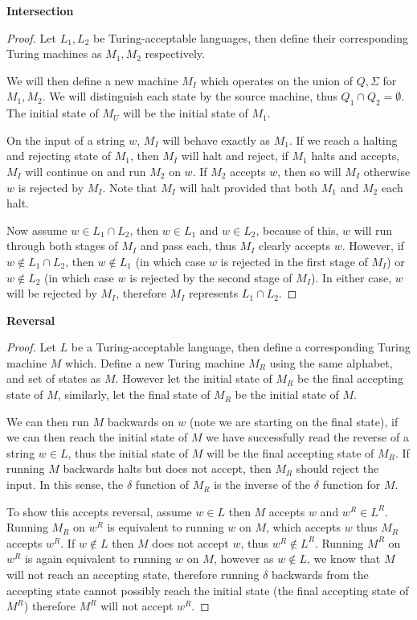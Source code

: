 \documentclass[12pt]{jhwhw}
\begin{document}
	\bigbreak
	\textbf{Intersection} \\
	\begin{proof}
		Let $L_1, L_2$ be Turing-acceptable languages, then define their corresponding 
		Turing machines as $M_1, M_2$ respectively.

		We will then define a new machine $M_I$ which operates on the union of
		$Q,\Sigma$ for $M_1, M_2$. We will distinguish each state by the source machine,
		thus $Q_1 \cap Q_2 = \emptyset$. The initial state of $M_U$ will be the initial
		state of $M_1$.

		On the input of a string $w$, $M_I$ will behave exactly as $M_1$. If we reach
		a halting and rejecting state of $M_1$, then $M_I$ will halt and reject, if $M_1$
		halts and accepts, $M_I$ will continue on and run $M_2$ on $w$. If $M_2$ accepts
		$w$, then so will $M_I$ otherwise $w$ is rejected by $M_I$.
		Note that $M_I$ will halt provided that both $M_1$ and $M_2$ each halt.

		Now assume $w\in L_1\cap L_2$, then $w\in L_1$ and $w\in L_2$, because of this,
		$w$ will run through both stages of $M_I$ and pass each, thus $M_I$ clearly accepts $w$.
		However, if $w\not\in L_1\cap L_2$, then $w\not\in L_1$ (in which case
		$w$ is rejected in the first stage of $M_I$) or $w\not\in L_2$ (in which case
		$w$ is rejected by the second stage of $M_I$). In either case, $w$ will be rejected
		by $M_I$, therefore $M_I$ represents $L_1\cap L_2$.
	\end{proof}

	\bigbreak
	\textbf{Reversal} \\
	\begin{proof}
		Let $L$ be a Turing-acceptable language, then define a corresponding Turing machine $M$
		which. Define a new Turing machine $M_R$ using the same alphabet, and set of states as $M$.
		However let the initial state of $M_R$ be the final accepting state of $M$, similarly, let
		the final state of $M_R$ be the initial state of $M$.

		We can then run $M$ backwards on $w$ (note we are starting on the final state), if we
		can then reach the initial state of $M$ we have successfully read the reverse of a string
		$w\in L$, thus the initial state of $M$ will be the final accepting state of $M_R$. If 
		running $M$ backwards halts but does not accept, then $M_R$ should reject the input.
		In this sense, the $\delta$ function of $M_R$ is the inverse of the $\delta$ function for $M$.

		To show this accepts reversal, assume $w\in L$ then $M$ accepts $w$ and $w^R\in L^R$.
		Running $M_R$ on $w^R$ is equivalent to running $w$ on $M$, which accepts $w$ thus $M_R$
		accepts $w^R$. If $w\not\in L$ then $M$ does not accept $w$, thus $w^R\not\in L^R$.
		Running $M^R$ on $w^R$ is again equivalent to running $w$ on $M$, however as $w\not\in L$,
		we know that $M$ will not reach an accepting state, therefore running $\delta$ backwards from
		the accepting state cannot possibly reach the initial state (the final accepting state of $M^R$)
		therefore $M^R$ will not accept $w^R$.
	\end{proof}
\end{document}

